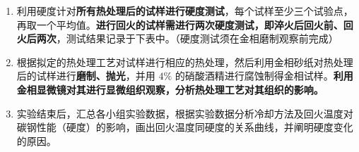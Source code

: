 \documentclass[a4paper,utf8]{article}
\begin{document}
\begin{enumerate}
\begin{enumerate}
            \item 45 钢淬水+高温回火工艺：加热温度为 $860 \pm \SI{10}{\degreeCelsius}$，根据试样有效尺寸计算保温时间，保温后出炉进行水淬。随后放入炉中加热至 \SI{600}{\degreeCelsius}，保温 1 个小时后出炉空冷。
        \end{enumerate}
        \item 利用硬度计对\textbf{所有热处理后的试样进行硬度测试}，每个试样至少三个试验点，再取一个平均值。\textbf{进行回火的试样需进行两次硬度测试，即淬火后回火前、回火后两次}，测试结果记录于下表中。（硬度测试须在金相磨制观察前完成）
        \item 根据拟定的热处理工艺对试样进行相应的热处理，然后利用金相砂纸对热处理后的试样进行\textbf{磨制、抛光}，并用 $4\%$ 的硝酸酒精进行腐蚀制得金相试样。\textbf{利用金相显微镜对其进行显微组织观察，分析热处理工艺对其组织的影响。}
        \item 实验结束后，汇总各小组实验数据，根据实验数据分析冷却方法及回火温度对碳钢性能（硬度）的影响，画出回火温度同硬度的关系曲线，并阐明硬度变化的原因。
    \end{enumerate}
\end{document}
